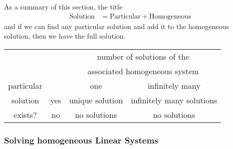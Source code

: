As a summary of this section, the title
%
\begin{align*}
\text{Solution} & = \text{Particular} + \text{Homogeneous}
\end{align*}
and if we can find any particular solution and add it to the homogeneous solution, then we have the full solution.

\begin{center}
\begin{tabular}{c|c|c|c|}
\multicolumn{1}{c}{}&\multicolumn{1}{c}{}& \multicolumn{2}{c}{number of solutions of the} \\
\multicolumn{1}{c}{}&\multicolumn{1}{c}{}& \multicolumn{2}{c}{associated homogeneous system} \\ \cline{3-4}
\multicolumn{1}{c}{particular}&\multicolumn{1}{c|}{}& one & infinitely many \\   \cline{2-4}
solution & yes & unique solution & infinitely many solutions \\ \cline{2-4}
exists? & no & no solutions & no solutions \\ \cline{2-4}
\end{tabular}
\end{center}

\subsubsection{Solving homogeneous Linear Systems}

